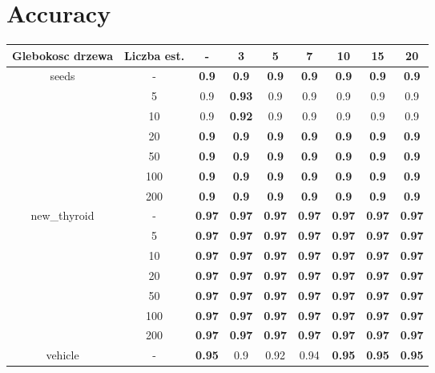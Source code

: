 \documentclass{article}%
\begin{document}
%
\normalsize%
\section*{Accuracy}%
\begin{longtable}{c|c|ccccccc}%
\hline%
Glebokosc drzewa&Liczba est.&{-}&3&5&7&10&15&20\\%
\hline%
\multirow{7}{*}{seeds}&{-}&\textbf{0.9}&\textbf{0.9}&\textbf{0.9}&\textbf{0.9}&\textbf{0.9}&\textbf{0.9}&\textbf{0.9}\\%
\cline{2%
-%
9}%
&5&0.9&\textbf{0.93}&0.9&0.9&0.9&0.9&0.9\\%
\cline{2%
-%
9}%
&10&0.9&\textbf{0.92}&0.9&0.9&0.9&0.9&0.9\\%
\cline{2%
-%
9}%
&20&\textbf{0.9}&\textbf{0.9}&\textbf{0.9}&\textbf{0.9}&\textbf{0.9}&\textbf{0.9}&\textbf{0.9}\\%
\cline{2%
-%
9}%
&50&\textbf{0.9}&\textbf{0.9}&\textbf{0.9}&\textbf{0.9}&\textbf{0.9}&\textbf{0.9}&\textbf{0.9}\\%
\cline{2%
-%
9}%
&100&\textbf{0.9}&\textbf{0.9}&\textbf{0.9}&\textbf{0.9}&\textbf{0.9}&\textbf{0.9}&\textbf{0.9}\\%
\cline{2%
-%
9}%
&200&\textbf{0.9}&\textbf{0.9}&\textbf{0.9}&\textbf{0.9}&\textbf{0.9}&\textbf{0.9}&\textbf{0.9}\\%
\hline%
\multirow{7}{*}{new\_thyroid}&{-}&\textbf{0.97}&\textbf{0.97}&\textbf{0.97}&\textbf{0.97}&\textbf{0.97}&\textbf{0.97}&\textbf{0.97}\\%
\cline{2%
-%
9}%
&5&\textbf{0.97}&\textbf{0.97}&\textbf{0.97}&\textbf{0.97}&\textbf{0.97}&\textbf{0.97}&\textbf{0.97}\\%
\cline{2%
-%
9}%
&10&\textbf{0.97}&\textbf{0.97}&\textbf{0.97}&\textbf{0.97}&\textbf{0.97}&\textbf{0.97}&\textbf{0.97}\\%
\cline{2%
-%
9}%
&20&\textbf{0.97}&\textbf{0.97}&\textbf{0.97}&\textbf{0.97}&\textbf{0.97}&\textbf{0.97}&\textbf{0.97}\\%
\cline{2%
-%
9}%
&50&\textbf{0.97}&\textbf{0.97}&\textbf{0.97}&\textbf{0.97}&\textbf{0.97}&\textbf{0.97}&\textbf{0.97}\\%
\cline{2%
-%
9}%
&100&\textbf{0.97}&\textbf{0.97}&\textbf{0.97}&\textbf{0.97}&\textbf{0.97}&\textbf{0.97}&\textbf{0.97}\\%
\cline{2%
-%
9}%
&200&\textbf{0.97}&\textbf{0.97}&\textbf{0.97}&\textbf{0.97}&\textbf{0.97}&\textbf{0.97}&\textbf{0.97}\\%
\hline%
\multirow{7}{*}{vehicle}&{-}&\textbf{0.95}&0.9&0.92&0.94&\textbf{0.95}&\textbf{0.95}&\textbf{0.95}\\%

\end{longtable}
\end{document}
